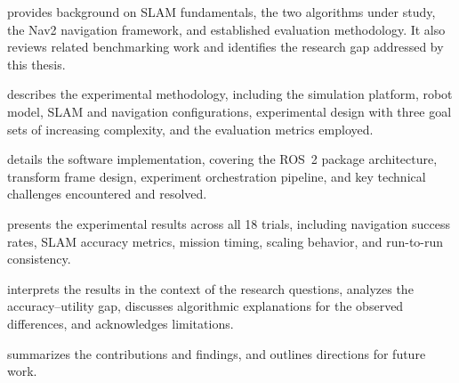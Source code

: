 \begin{description}[style=nextline]
\item[Chapter~\ref{ch:background}] provides background on SLAM fundamentals, the two algorithms under study, the Nav2 navigation framework, and established evaluation methodology. It also reviews related benchmarking work and identifies the research gap addressed by this thesis.
\item[Chapter~\ref{ch:methodology}] describes the experimental methodology, including the simulation platform, robot model, SLAM and navigation configurations, experimental design with three goal sets of increasing complexity, and the evaluation metrics employed.
\item[Chapter~\ref{ch:implementation}] details the software implementation, covering the ROS~2 package architecture, transform frame design, experiment orchestration pipeline, and key technical challenges encountered and resolved.
\item[Chapter~\ref{ch:results}] presents the experimental results across all 18 trials, including navigation success rates, SLAM accuracy metrics, mission timing, scaling behavior, and run-to-run consistency.
\item[Chapter~\ref{ch:discussion}] interprets the results in the context of the research questions, analyzes the accuracy--utility gap, discusses algorithmic explanations for the observed differences, and acknowledges limitations.
\item[Chapter~\ref{ch:conclusion}] summarizes the contributions and findings, and outlines directions for future work.
\end{description}
